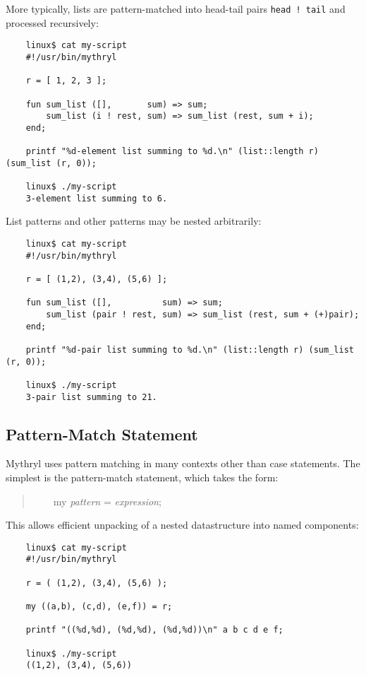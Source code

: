 More typically, lists are pattern-matched into head-tail pairs 
{\tt head ! tail} and processed recursively:

\begin{verbatim}
    linux$ cat my-script
    #!/usr/bin/mythryl

    r = [ 1, 2, 3 ];

    fun sum_list ([],       sum) => sum;
        sum_list (i ! rest, sum) => sum_list (rest, sum + i);
    end;

    printf "%d-element list summing to %d.\n" (list::length r) (sum_list (r, 0));

    linux$ ./my-script
    3-element list summing to 6.
\end{verbatim}

List patterns and other patterns may be nested arbitrarily:

\begin{verbatim}
    linux$ cat my-script
    #!/usr/bin/mythryl

    r = [ (1,2), (3,4), (5,6) ];

    fun sum_list ([],          sum) => sum;
        sum_list (pair ! rest, sum) => sum_list (rest, sum + (+)pair);
    end;

    printf "%d-pair list summing to %d.\n" (list::length r) (sum_list (r, 0));

    linux$ ./my-script
    3-pair list summing to 21.
\end{verbatim}

\cutend*

\subsection{Pattern-Match Statement}
\label{section:ref:case-expressions-and-pattern-matching:pattern-match-statement}

Mythryl uses pattern matching in many contexts other than 
case statements.  The simplest is the pattern-match statement, 
which takes the form:

\begin{quotation}
~~~~my {\it pattern} = {\it expression};
\end{quotation}

This allows efficient unpacking of a nested datastructure into named components:

\begin{verbatim}
    linux$ cat my-script
    #!/usr/bin/mythryl

    r = ( (1,2), (3,4), (5,6) );

    my ((a,b), (c,d), (e,f)) = r;

    printf "((%d,%d), (%d,%d), (%d,%d))\n" a b c d e f;

    linux$ ./my-script
    ((1,2), (3,4), (5,6))
\end{verbatim}

